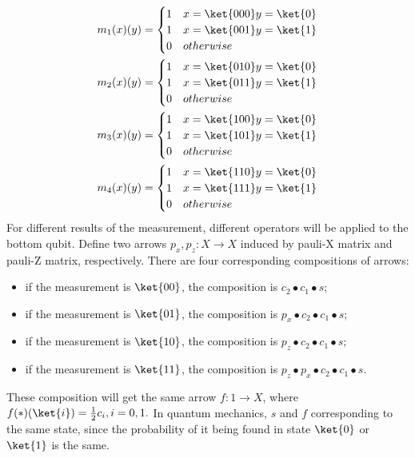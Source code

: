 \documentclass{llncs}
\begin{document}
$$
\begin{aligned}
m_1(x)(y)&=\begin{cases}1 &x=\ket{000} y=\ket{0}\\ 1 &x=\ket{001} y=\ket{1}\\ 0 & otherwise\end{cases}\\
m_2(x)(y)&=\begin{cases}1 &x=\ket{010} y=\ket{0}\\ 1 &x=\ket{011} y=\ket{1}\\ 0 & otherwise\end{cases}\\
m_3(x)(y)&=\begin{cases}1 &x=\ket{100} y=\ket{0}\\ 1 &x=\ket{101} y=\ket{1}\\ 0 & otherwise\end{cases}\\
m_4(x)(y)&=\begin{cases}1 &x=\ket{110} y=\ket{0}\\ 1 &x=\ket{111} y=\ket{1}\\ 0 & otherwise\end{cases}
\end{aligned}
$$
For different results of the measurement, different operators will be applied to the bottom qubit. Define two arrows $p_x,p_z: X\rightarrow X$ induced by pauli-X matrix and pauli-Z matrix, respectively. There are four corresponding compositions of arrows:
\begin{itemize}
\item if the measurement is $\ket{00}$, the composition is $c_2\bullet c_1\bullet s$;
\item if the measurement is $\ket{01}$, the composition is $p_x\bullet c_2\bullet c_1\bullet s$;
\item if the measurement is $\ket{10}$, the composition is $p_z\bullet c_2\bullet c_1\bullet s$;
\item if the measurement is $\ket{11}$, the composition is $p_z\bullet p_x\bullet c_2\bullet c_1\bullet s$.
\end{itemize}
These composition will get the same arrow $f:1\rightarrow X$, where $f(\ast)(\ket{i})=\frac{1}{2}c_i, i=0,1.$ In quantum mechanics, $s$ and $f$ corresponding to the same state, since the probability of it being found in state $\ket{0}$ or $\ket{1}$ is the same. 




\end{document}
